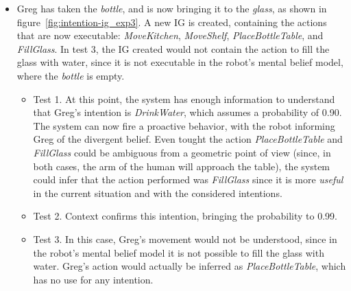 \begin{itemize}
\begin{itemize}
		\end{itemize} 
	\item Greg has taken the \textit{bottle}, and is now bringing it to the \textit{glass}, as shown in figure~\ref{fig:intention-ig_exp3}. A new IG is created, containing the actions that are now executable: \textit{MoveKitchen}, \textit{MoveShelf}, \textit{PlaceBottleTable}, and \textit{FillGlass}. In test 3, the IG created would not contain the action to fill the glass with water, since it is not executable in the robot's mental belief model, where the \textit{bottle} is empty.
		\begin{itemize}
			\item Test 1. At this point, the system has enough information to understand that Greg's intention is \textit{DrinkWater}, which assumes a probability of 0.90. The system can now fire a proactive behavior, with the robot informing Greg of the divergent belief. Even tought the action \textit{PlaceBottleTable} and \textit{FillGlass} could be ambiguous from a geometric point of view (since, in both cases, the arm of the human will approach the table), the system could infer that the action performed was \textit{FillGlass} since it is more \textit{useful} in the current situation and with the considered intentions.
			\item Test 2. Context confirms this intention, bringing the probability to 0.99.
			\item Test 3. In this case, Greg's movement would not be understood, since in the robot's mental belief model it is not possible to fill the glass with water. Greg's action would actually be inferred as \textit{PlaceBottleTable}, which has no use for any intention.
		\end{itemize}
\end{itemize}


